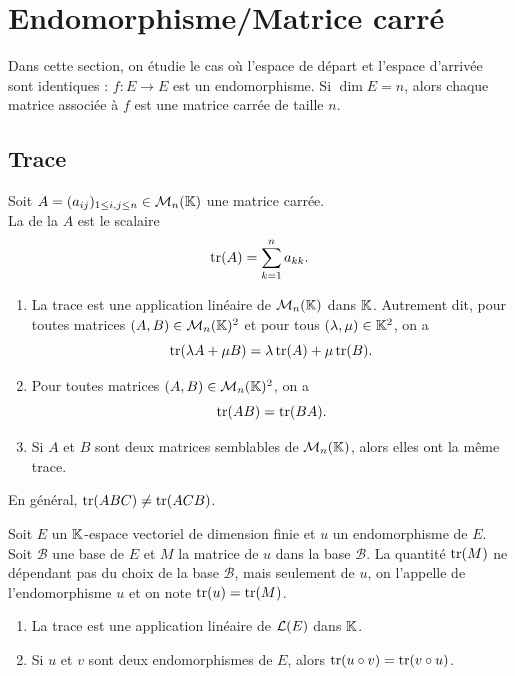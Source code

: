 \documentclass{book}
\begin{document}
\section{Endomorphisme/Matrice carré}
Dans cette section, on étudie le cas où l'espace de départ et l'espace d'arrivée sont identiques : $f : E\to E$ est un
endomorphisme. Si $\dim E = n$, alors chaque matrice associée à $f$ est une matrice carrée de taille $n$.

\subsection{Trace}
\begin{Definition}[Trace]
Soit $A = (a_{ij})_{1\leq i,j\leq n}\in  \mathcal{M}_{n}(\mathbb{K})$ une matrice carrée.\\
La  de la $A$ est le scalaire
\[ \operatorname{tr}(A) = \sum  _{k=1}^n a_{k k}. \]
\end{Definition}
\begin{Proposition}[Propriétés]
\begin{enumerate}
\item La trace est une application linéaire de $\mathcal{M}_{n}(\mathbb{K})$ dans $\mathbb{K} $.
  Autrement dit, pour toutes matrices $(A,B)\in  \mathcal{M}_{n}(\mathbb{K})^2$ et pour tous $(\lambda ,\mu  )\in  \mathbb{K} ^2$, on a
  \[ \operatorname{tr}(\lambda A + \mu  B) = \lambda \operatorname{tr}(A) + \mu  \operatorname{tr}(B). \]
\item Pour toutes matrices $(A,B) \in  \mathcal{M}_{n}(\mathbb{K})^2$, on a
  \[ \operatorname{tr}(AB) = \operatorname{tr}(BA). \]
\item Si $A$ et $B$ sont deux matrices semblables de $\mathcal{M}_{n}(\mathbb{K})$, alors elles ont la même trace.
\end{enumerate}
\end{Proposition}
\begin{Remarque}
En général, $\operatorname{tr}(ABC)\neq \operatorname{tr}(ACB)$.
\end{Remarque}

\begin{Definition}
Soit $E$ un $\mathbb{K} $-espace vectoriel de dimension finie et $u$ un endomorphisme de $E$.
Soit $\mathcal{B}$ une base de $E$ et $M$ la matrice de $u$ dans la base $\mathcal{B}$.
La quantité $\operatorname{tr}(M)$ ne dépendant pas du choix de la base $\mathcal{B}$, mais seulement de $u$, on l'appelle  de l'endomorphisme $u$ et on note $\operatorname{tr}(u) = \operatorname{tr}(M)$.
\end{Definition}


\begin{Proposition}[Propriétés]
\begin{enumerate}
\item La trace est une application linéaire de $\mathcal{L}(E)$ dans $\mathbb{K} $.
\item Si $u$ et $v$ sont deux endomorphismes de $E$, alors $\operatorname{tr}(u\circ v) = \operatorname{tr}(v\circ u)$.
\end{enumerate}
\end{Proposition}
\end{document}
